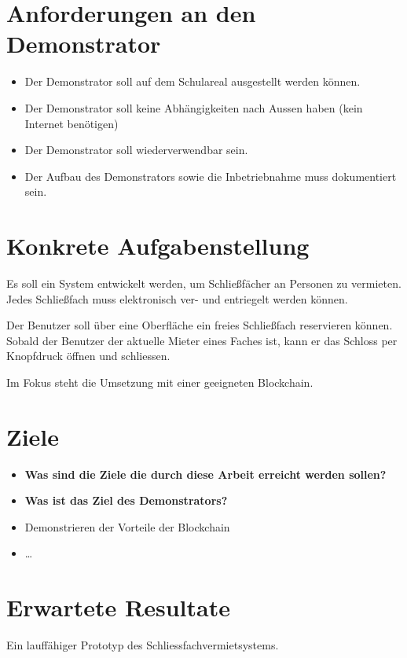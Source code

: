 \section{Anforderungen an den Demonstrator}
\label{sec:Anforderungen an den Demonstrator}
\begin{itemize}
    \item Der Demonstrator soll auf dem Schulareal ausgestellt werden können. 
    \item Der Demonstrator soll keine Abhängigkeiten nach Aussen haben (kein Internet benötigen)
    \item Der Demonstrator soll wiederverwendbar sein.
    \item Der Aufbau des Demonstrators sowie die Inbetriebnahme muss dokumentiert sein.
\end{itemize}

\section{Konkrete Aufgabenstellung}
\label{sec:Konkrete Aufgabenstellung}
Es soll ein System entwickelt werden, um Schließfächer an Personen zu vermieten. Jedes Schließfach muss elektronisch ver- und entriegelt werden können.

Der Benutzer soll über eine Oberfläche ein freies Schließfach reservieren können. Sobald der Benutzer der aktuelle Mieter eines Faches ist, kann er das Schloss per Knopfdruck öffnen und schliessen.

Im Fokus steht die Umsetzung mit einer geeigneten Blockchain.

\section{Ziele}
\label{sec:Ziele}
\begin{itemize}
    \item \textbf{ Was sind die Ziele die durch diese Arbeit erreicht werden sollen? }
    \item \textbf{ Was ist das Ziel des Demonstrators? }
\end{itemize}

\begin{itemize}
    \item Demonstrieren der Vorteile der Blockchain
    \item \dots
\end{itemize}


\section{Erwartete Resultate}
\label{sec:Erwartete_Resultate}

Ein lauffähiger Prototyp des Schliessfachvermietsystems.